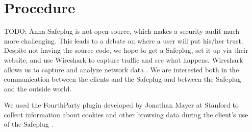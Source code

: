 \section{Procedure}
\label{sec:procedure}
TODO: Anna
Safeplug is not open source, which makes a security audit much more challenging.  This leads to a debate on where a user will put his/her trust.  Despite not having the source code, we hope to get a Safeplug, set it up via their website, and use Wireshark to capture traffic and see what happens.  Wireshark allows us to capture and analyze network data \cite{wireshark}.  We are interested both in the communication between the clients and the Safeplug and between the Safeplug and the outside world. 

We used the FourthParty plugin developed by Jonathan Mayer at Stanford to collect information about cookies and other browsing data during the client's use of the Safeplug \cite{fourthparty}.
